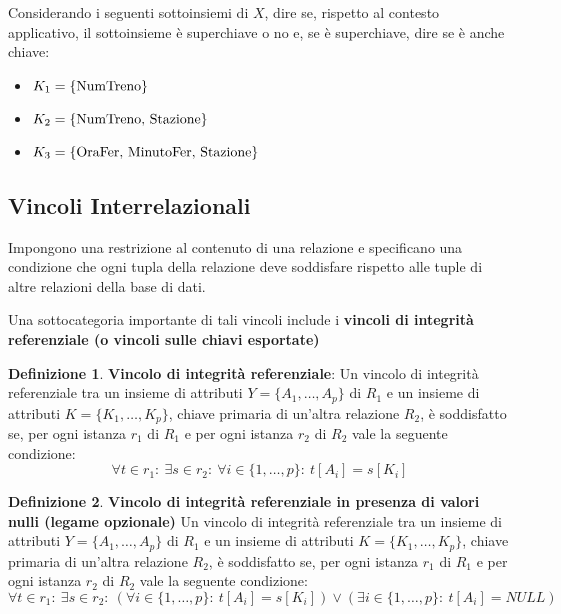 \documentclass[a4paper, 10pt]{article}
\theoremstyle{definition}
\newtheorem*{defn}{Definizione}
\begin{document}
		Considerando i seguenti sottoinsiemi di $X$, dire se, rispetto al
		contesto applicativo, il sottoinsieme è superchiave o no e, se è
		superchiave, dire se è anche chiave:
		\begin{itemize}
			\item $K_1=\{\textup{NumTreno}\}$
			\item $K_2=\{\textup{NumTreno, Stazione}\}$
			\item $K_3=\{\textup{OraFer, MinutoFer, Stazione}\}$
		\end{itemize}

		\subsection*{Vincoli Interrelazionali}
			Impongono una restrizione al contenuto di una
			relazione e specificano una condizione che ogni tupla
			della relazione deve soddisfare rispetto alle tuple di
			altre relazioni della base di dati.
			
			Una sottocategoria importante di tali vincoli include i
			\textbf{vincoli di integrità referenziale (o vincoli sulle
			chiavi esportate)}
	
			\begin{defn}
				\textbf{Vincolo di integrità referenziale}: 
				Un vincolo di integrità referenziale tra un insieme di
				attributi $Y=\{A_1 , \dots, A_p \}$ di $R_1$ e un insieme di attributi $K=\{K_1 , \dots, K_p \}$, chiave primaria di un'altra relazione $R_2$, è soddisfatto se, per ogni istanza $r_1$ di $R_1$ e per ogni
				istanza $r_2$ di $R_2$ vale la seguente condizione:
				\[
					\forall t \in r_1 : \: \exists s \in r_2 : \:
					 \forall i \in \{1,\dots, p\} : \: t[A_i] = s[K _i]
				\]
				
			\end{defn}

			\begin{defn}
			\textbf{Vincolo di integrità referenziale in
				presenza di valori nulli (legame opzionale)}
				Un vincolo di integrità referenziale tra un insieme di
				attributi $Y=\{A_1 , \dots, A_p \}$ di $R_1$ e un insieme di attributi $K=\{K_1 , \dots, K_p \}$, chiave primaria di un'altra relazione $R_2$, è soddisfatto se, per ogni istanza $r_1$ di $R_1$ e per ogni istanza $r_2$ di $R_2$ vale la seguente condizione:
				\[
					\forall t \in r_1 : \: \exists s \in r_2 : \:
					 (\forall i \in  \{1,\dots, p\} : \: t[A_i ] = s[K_i ]) \vee
				(\exists i \in \{1,\dots, p\} : \: t[A_i ] = NULL)
				\]
				
			\end{defn}
			
\end{document}

